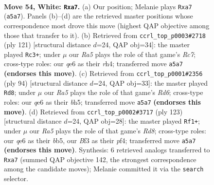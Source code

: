 \documentclass[11pt]{article}
\begin{document}
\clearpage

\begin{figure}[p]\centering
\begin{subfigure}{0.46\textwidth}\centering
\resizebox{\linewidth}{!}{%
\newchessgame
\chessboard[
  setfen={8/p7/4qP2/R7/1p1k4/b4BK1/8/8 w - - 2 54},
  showmover=false,
  pgfstyle=straightmove, color=movearrow, markmove={a5-a7}
]}
\caption{}
\end{subfigure}\hfill
\begin{subfigure}{0.46\textwidth}\centering
\resizebox{\linewidth}{!}{%
\newchessgame
\chessboard[
  setfen={8/4kb2/8/8/7R/4KP1p/2r1B3/8 b - - 3 61},
  showmover=false,
  pgfstyle=straightmove, color=movearrow, markmove={c2-c3}
]}
\caption{}
\end{subfigure}
\\[4pt]
\begin{subfigure}{0.46\textwidth}\centering
\resizebox{\linewidth}{!}{%
\newchessgame
\chessboard[
  setfen={8/8/1p1R4/4p1kb/1P1b4/8/3K4/1B6 w - - 11 48},
  showmover=false,
  pgfstyle=straightmove, color=movearrow, markmove={d6-d8}
]}
\caption{}
\end{subfigure}\hfill
\begin{subfigure}{0.46\textwidth}\centering
\resizebox{\linewidth}{!}{%
\newchessgame
\chessboard[
  setfen={8/8/6k1/1B6/2pB1P1p/2P2K2/8/3r4 b - - 3 62},
  showmover=false,
  pgfstyle=straightmove, color=movearrow, markmove={d1-f1}
]}
\caption{}
\end{subfigure}
\caption{\textbf{Move 54, White: \texttt{Rxa7}.} (a) Our position; Melanie plays \texttt{Rxa7} (\texttt{a5a7}). Panels (b)--(d) are the retrieved master positions whose correspondence most drove this move (highest QAP objective among those that transfer to it). (b) Retrieved from \texttt{ccrl\_top\_p0003\#2718} (ply 121) [structural distance $d$=24, QAP obj=34]: the master played \texttt{Rc3+}; under $\mu$ our \emph{Ra5} plays the role of that game's \emph{Rc7}; cross-type roles: our \emph{q}e6 as their \emph{r}h4; transferred move \texttt{a5a7} \textbf{(endorses this move)}. (c) Retrieved from \texttt{ccrl\_top\_p0001\#2356} (ply 94) [structural distance $d$=24, QAP obj=33]: the master played \texttt{Rd8}; under $\mu$ our \emph{Ra5} plays the role of that game's \emph{Rd6}; cross-type roles: our \emph{q}e6 as their \emph{b}h5; transferred move \texttt{a5a7} \textbf{(endorses this move)}. (d) Retrieved from \texttt{ccrl\_top\_p0002\#3717} (ply 123) [structural distance $d$=24, QAP obj=28]: the master played \texttt{Rf1+}; under $\mu$ our \emph{Ra5} plays the role of that game's \emph{Rd8}; cross-type roles: our \emph{q}e6 as their \emph{b}b5, our \emph{B}f3 as their \emph{p}f4; transferred move \texttt{a5a7} \textbf{(endorses this move)}. Synthesis: 6 retrieved analogs transferred to \texttt{Rxa7} (summed QAP objective 142, the strongest correspondence among the candidate moves); Melanie committed it via the \texttt{search} selector.}
\label{fig:thought-m106}
\end{figure}
\end{document}

